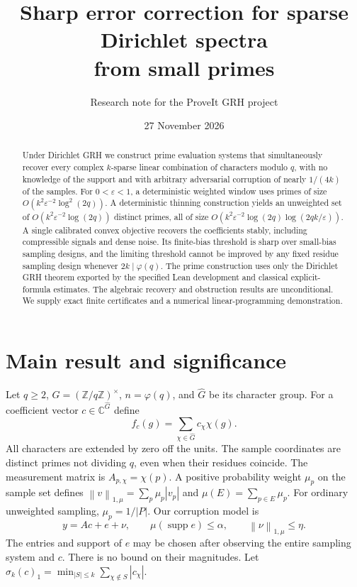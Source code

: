 \documentclass[11pt]{article}
\title{Sharp error correction for sparse Dirichlet spectra\\from small primes}
\author{Research note for the ProveIt GRH project}
\date{27 November 2026}
\theoremstyle{remark}\newtheorem{remark}[theorem]{Remark}
\newcommand{\C}{\mathbb C}
\newcommand{\Z}{\mathbb Z}
\newcommand{\abs}[1]{\left|#1\right|}
\newcommand{\norm}[1]{\left\|#1\right\|}
\newcommand{\supp}{\operatorname{supp}}
\begin{document}
\maketitle
\begin{abstract}
Under Dirichlet GRH we construct prime evaluation systems that simultaneously recover every complex $k$-sparse linear combination of characters modulo $q$, with no knowledge of the support and with arbitrary adversarial corruption of nearly $1/(4k)$ of the samples. For $0<\varepsilon<1$, a deterministic weighted window uses primes of size $O(k^2\varepsilon^{-2}\log^2(2q))$. A deterministic thinning construction yields an unweighted set of $O(k^2\varepsilon^{-2}\log(2q))$ distinct primes, all of size $O(k^2\varepsilon^{-2}\log(2q)\log(2qk/\varepsilon))$. A single calibrated convex objective recovers the coefficients stably, including compressible signals and dense noise. Its finite-bias threshold is sharp over small-bias sampling designs, and the limiting threshold cannot be improved by any fixed residue sampling design whenever $2k\mid\varphi(q)$. The prime construction uses only the Dirichlet GRH theorem exported by the specified Lean development and classical explicit-formula estimates. The algebraic recovery and obstruction results are unconditional. We supply exact finite certificates and a numerical linear-programming demonstration.
\end{abstract}

\section{Main result and significance}
Let $q\ge2$, $G=(\Z/q\Z)^\times$, $n=\varphi(q)$, and $\widehat G$ be its character group. For a coefficient vector $c\in\C^{\widehat G}$ define
\[
 f_c(g)=\sum_{\chi\in\widehat G}c_\chi\chi(g).
\]
All characters are extended by zero off the units. The sample coordinates are distinct primes not dividing $q$, even when their residues coincide. The measurement matrix is $A_{p,\chi}=\chi(p)$. A positive probability weight $\mu_p$ on the sample set defines $\norm{v}_{1,\mu}=\sum_p\mu_p\abs{v_p}$ and $\mu(E)=\sum_{p\in E}\mu_p$. For ordinary unweighted sampling, $\mu_p=1/|P|$. Our corruption model is
\begin{equation}\label{eq:observation}
 y=Ac+e+\nu,\qquad \mu(\supp e)\le\alpha,\qquad \norm{\nu}_{1,\mu}\le\eta.
\end{equation}
The entries and support of $e$ may be chosen after observing the entire sampling system and $c$. There is no bound on their magnitudes. Let $\sigma_k(c)_1=\min_{|S|\le k}\sum_{\chi\notin S}|c_\chi|$.
\end{document}
